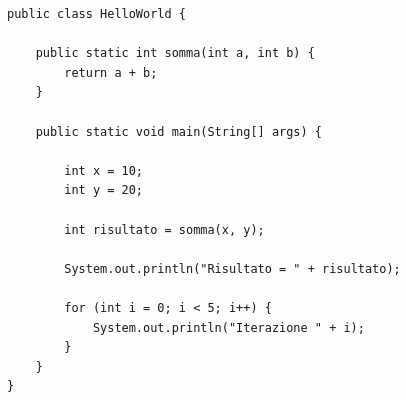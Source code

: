 \begin{lstlisting}[style=javastyle, caption={Classe di prova}]
public class HelloWorld {

    public static int somma(int a, int b) {
        return a + b;
    }

    public static void main(String[] args) {

        int x = 10;
        int y = 20;

        int risultato = somma(x, y);

        System.out.println("Risultato = " + risultato);

        for (int i = 0; i < 5; i++) {
            System.out.println("Iterazione " + i);
        }
    }
}
\end{lstlisting}